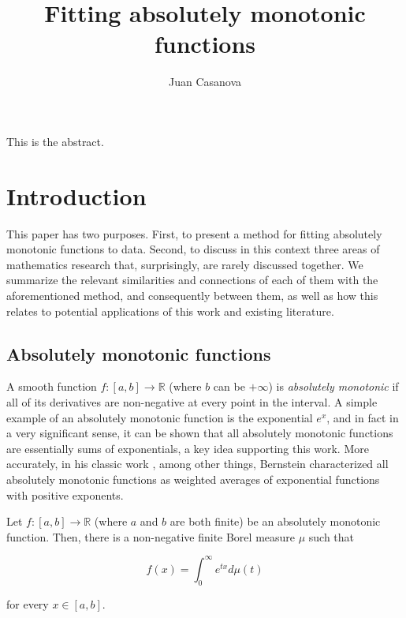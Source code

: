 \documentclass[12pt,a4paper]{article}
\title{Fitting absolutely monotonic functions}
\author{Juan Casanova}
\newcommand{\realfunction}[2] {{#1: #2 \rightarrow \mathbb{R}}}
\begin{document}
\maketitle

This is the abstract.

\tableofcontents

\section{Introduction}

This paper has two purposes. First, to present a method for fitting absolutely monotonic functions to data. Second, to discuss in this context three areas of mathematics research that, surprisingly, are rarely discussed together. We summarize the relevant similarities and connections of each of them with the aforementioned method, and consequently between them, as well as how this relates to potential applications of this work and existing literature.

\subsection{Absolutely monotonic functions}

A smooth function $\realfunction{f}{[a,b]}$ (where $b$ can be $+\infty$) is {\emph{absolutely monotonic}} if all of its derivatives are non-negative at every point in the interval. A simple example of an absolutely monotonic function is the exponential $e^x$, and in fact in a very significant sense, it can be shown that all absolutely monotonic functions are essentially sums of exponentials, a key idea supporting this work. More accurately, in his classic work \cite{1929_bernstein_absolutely_monotonic}, among other things, Bernstein characterized all absolutely monotonic functions as weighted averages of exponential functions with positive exponents.

\begin{theorem}
\label{bernstein_theorem}
Let $\realfunction{f}{[a,b]}$ (where $a$ and $b$ are both finite) be an absolutely monotonic function. Then, there is a non-negative finite Borel measure $\mu$ such that

\begin{equation}
f(x) = \int_{0}^{\infty} e^{tx} d \mu(t)
\end{equation}

\noindent for every $x \in [a,b]$.
\end{theorem}
\end{document}
